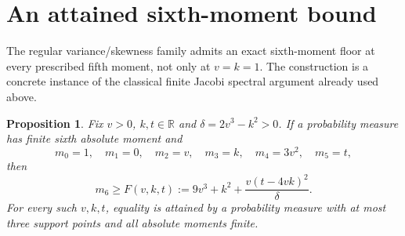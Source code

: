 \documentclass[11pt]{article}
\newtheorem{proposition}[theorem]{Proposition}
\newcommand{\R}{\mathbb R}
\begin{document}
\section{An attained sixth-moment bound}
The regular variance/skewness family admits an exact sixth-moment
floor at every prescribed fifth moment, not only at $v=k=1$.
The construction is a concrete instance of the classical finite
Jacobi spectral argument already used above.

\begin{proposition}\label{prop:sharp}
Fix $v>0$, $k,t\in\R$ and $\delta=2v^3-k^2>0$. If a probability
measure has finite sixth absolute moment and
\[
 m_0=1,\quad m_1=0,\quad m_2=v,\quad m_3=k,
 \quad m_4=3v^2,\quad m_5=t,
\]
then
\begin{equation}\label{eq:regular-sixth}
 m_6\geq F(v,k,t):=9v^3+k^2+\frac{v(t-4vk)^2}{\delta}.
\end{equation}
For every such $v,k,t$, equality is attained by a probability measure
with at most three support points and all absolute moments finite.
\end{proposition}
\end{document}
